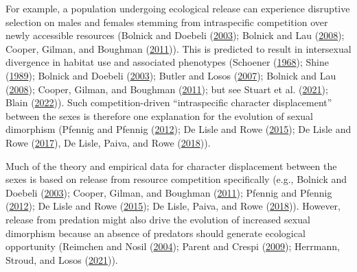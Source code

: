 \documentclass[
  12pt,
]{article}
\begin{document}
For example, a population undergoing ecological release can experience
disruptive selection on males and females stemming from intraspecific
competition over newly accessible resources (Bolnick and Doebeli
(\protect\hyperlink{ref-BolnickandDoebeli2003}{2003}); Bolnick and Lau
(\protect\hyperlink{ref-BolnickandLau2008}{2008}); Cooper, Gilman, and
Boughman (\protect\hyperlink{ref-Cooperetal2011}{2011})). This is
predicted to result in intersexual divergence in habitat use and
associated phenotypes (Schoener
(\protect\hyperlink{ref-Schoener1968}{1968}); Shine
(\protect\hyperlink{ref-Shine1989}{1989}); Bolnick and Doebeli
(\protect\hyperlink{ref-BolnickandDoebeli2003}{2003}); Butler and Losos
(\protect\hyperlink{ref-Butleretal2007}{2007}); Bolnick and Lau
(\protect\hyperlink{ref-BolnickandLau2008}{2008}); Cooper, Gilman, and
Boughman (\protect\hyperlink{ref-Cooperetal2011}{2011}); but see Stuart
et al. (\protect\hyperlink{ref-Stuartetal2021}{2021}); Blain
(\protect\hyperlink{ref-Blain2022}{2022})). Such competition-driven
``intraspecific character displacement'' between the sexes is therefore
one explanation for the evolution of sexual dimorphism (Pfennig and
Pfennig (\protect\hyperlink{ref-PfennigandPfennig2012}{2012}); De Lisle
and Rowe (\protect\hyperlink{ref-DeLisleandRowe2015}{2015}); De Lisle
and Rowe (\protect\hyperlink{ref-DeLisleandRowe2017}{2017}), De Lisle,
Paiva, and Rowe (\protect\hyperlink{ref-DeLisleetal2018}{2018})).

Much of the theory and empirical data for character displacement between
the sexes is based on release from resource competition specifically
(e.g., Bolnick and Doebeli
(\protect\hyperlink{ref-BolnickandDoebeli2003}{2003}); Cooper, Gilman,
and Boughman (\protect\hyperlink{ref-Cooperetal2011}{2011}); Pfennig and
Pfennig (\protect\hyperlink{ref-PfennigandPfennig2012}{2012}); De Lisle
and Rowe (\protect\hyperlink{ref-DeLisleandRowe2015}{2015}); De Lisle,
Paiva, and Rowe (\protect\hyperlink{ref-DeLisleetal2018}{2018})).
However, release from predation might also drive the evolution of
increased sexual dimorphism because an absence of predators should
generate ecological opportunity (Reimchen and Nosil
(\protect\hyperlink{ref-ReimchenandNosil2004}{2004}); Parent and Crespi
(\protect\hyperlink{ref-ParentandCrespi2009}{2009}); Herrmann, Stroud,
and Losos (\protect\hyperlink{ref-Herrmannetal2021}{2021})).
\end{document}
